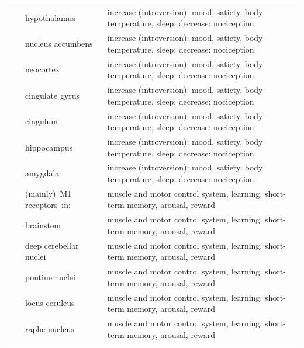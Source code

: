 \begin{longtable}[t]{>{\raggedright\arraybackslash}p{5em}>{\raggedright\arraybackslash}p{15em}>{\raggedright\arraybackslash}p{10em}>{\raggedright\arraybackslash}p{15em}}
 &  & hypothalamus & increase (introversion): mood, satiety, body temperature, sleep;  decrease: nociception\\

\rowcolor{gray!6}   &  & nucleus accumbens & increase (introversion): mood, satiety, body temperature, sleep;  decrease: nociception\\

 &  & neocortex & increase (introversion): mood, satiety, body temperature, sleep;  decrease: nociception\\

\rowcolor{gray!6}   &  & cingulate gyrus & increase (introversion): mood, satiety, body temperature, sleep;  decrease: nociception\\

 &  & cingulum & increase (introversion): mood, satiety, body temperature, sleep;  decrease: nociception\\

\rowcolor{gray!6}   &  & hippocampus & increase (introversion): mood, satiety, body temperature, sleep;  decrease: nociception\\

\multirow{-16}{5em}{\raggedright\arraybackslash Serotonin system} & \multirow{-12}{15em}{\raggedright\arraybackslash rostral dorsal raphe nucleus} & amygdala & increase (introversion): mood, satiety, body temperature, sleep;  decrease: nociception\\
\cmidrule{1-4}
\rowcolor{gray!6}   &  & (mainly) M1 receptors in: & muscle and motor control system, learning, short-term memory, arousal, reward\\

 &  & brainstem & muscle and motor control system, learning, short-term memory, arousal, reward\\

\rowcolor{gray!6}   &  & deep cerebellar nuclei & muscle and motor control system, learning, short-term memory, arousal, reward\\

 &  & pontine nuclei & muscle and motor control system, learning, short-term memory, arousal, reward\\

\rowcolor{gray!6}   &  & locus ceruleus & muscle and motor control system, learning, short-term memory, arousal, reward\\

 &  & raphe nucleus & muscle and motor control system, learning, short-term memory, arousal, reward\\


\end{longtable}

